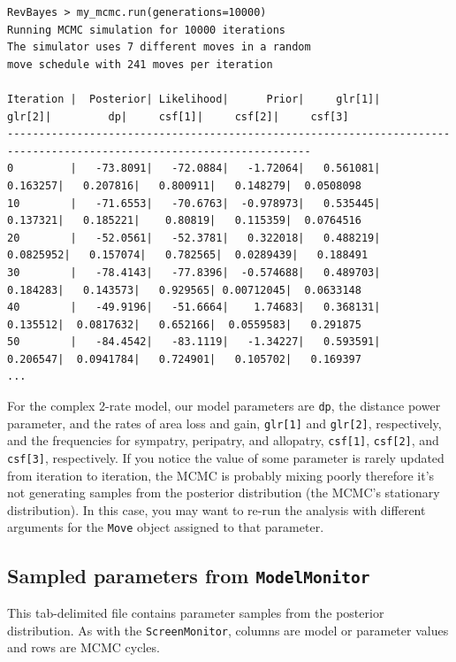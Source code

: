 \documentclass[11pt]{article}
\begin{document}
\begin{snugshade}
\begin{lstlisting}[basicstyle=\tiny \listingsfont, columns=texcl]
RevBayes > my_mcmc.run(generations=10000)
Running MCMC simulation for 10000 iterations
The simulator uses 7 different moves in a random
move schedule with 241 moves per iteration

Iteration |  Posterior| Likelihood|      Prior|     glr[1]|     glr[2]|         dp|     csf[1]|     csf[2]|     csf[3]
----------------------------------------------------------------------------------------------------------------------
0         |   -73.8091|   -72.0884|   -1.72064|   0.561081|   0.163257|   0.207816|   0.800911|   0.148279|  0.0508098
10        |   -71.6553|   -70.6763|  -0.978973|   0.535445|   0.137321|   0.185221|    0.80819|   0.115359|  0.0764516
20        |   -52.0561|   -52.3781|   0.322018|   0.488219|  0.0825952|   0.157074|   0.782565|  0.0289439|   0.188491
30        |   -78.4143|   -77.8396|  -0.574688|   0.489703|   0.184283|   0.143573|   0.929565| 0.00712045|  0.0633148
40        |   -49.9196|   -51.6664|    1.74683|   0.368131|   0.135512|  0.0817632|   0.652166|  0.0559583|   0.291875
50        |   -84.4542|   -83.1119|   -1.34227|   0.593591|   0.206547|  0.0941784|   0.724901|   0.105702|   0.169397
...
\end{lstlisting}
\end{snugshade}

For the complex 2-rate model, our model parameters are {\tt dp}, the distance power parameter, and the rates of area loss and gain, {\tt glr[1]} and {\tt glr[2]}, respectively, and the frequencies for sympatry, peripatry, and allopatry, {\tt csf[1]}, {\tt csf[2]}, and {\tt csf[3]}, respectively. 
If you notice the value of some parameter is rarely updated from iteration to iteration, the MCMC is probably mixing poorly therefore it's not generating samples from the posterior distribution (the MCMC's stationary distribution).
In this case, you may want to re-run the analysis with different arguments for the {\tt Move} object assigned to that parameter.

\subsection{Sampled parameters from {\tt ModelMonitor}}

This tab-delimited file contains parameter samples from the posterior distribution.
As with the {\tt ScreenMonitor}, columns are model or parameter values and rows are MCMC cycles.
\end{document}

